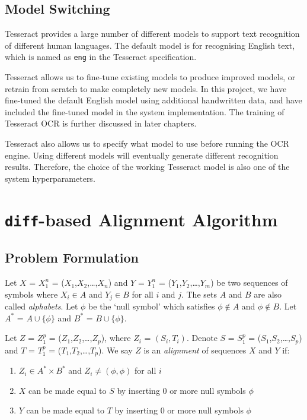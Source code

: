 \subsection{Model Switching}

Tesseract provides a large number of different models to support text recognition of different human languages. The default model is for recognising English text, which is named as \texttt{eng} in the Tesseract specification. 

Tesseract allows us to fine-tune existing models to produce improved models, or retrain from scratch to make completely new models. In this project, we have fine-tuned the default English model using additional handwritten data, and have included the fine-tuned model in the system implementation. The training of Tesseract OCR is further discussed in later chapters. 

Tesseract also allows us to specify what model to use before running the OCR engine. Using different models will eventually generate different recognition results. Therefore, the choice of the working Tesseract model is also one of the system hyperparameters.


\section{\texttt{diff}-based Alignment Algorithm}

\subsection{Problem Formulation}

Let $X$ = $X_1^n$ = ($X_1$,$X_2$,\ldots,$X_n$) and $Y$ = $Y_1^n$ = ($Y_1$,$Y_2$,\ldots,$Y_m$) be two sequences of symbols where $X_i \in A$ and $Y_j \in B$ for all $i$ and $j$. The sets $A$ and $B$ are also called \textit{alphabets}. Let $\phi$ be the `null symbol' which satisfies $\phi \notin A$ and $\phi \notin B$. Let $A^*$ = $A\cup\{\phi\}$ and $B^*$ = $B\cup\{\phi\}$.

Let $Z$ = $Z_1^p$ = ($Z_1$,$Z_2$,\ldots,$Z_p$), where $Z_i$ = $(S_i, T_i)$. Denote $S$ = $S_1^p$ = ($S_1$,$S_2$,\ldots,$S_p$) and $T$ = $T_1^p$ = ($T_1$,$T_2$,\ldots,$T_p$). We say $Z$ is an \textit{alignment} of sequences $X$ and $Y$ if:
\begin{enumerate}
  \item $Z_i \in A^* \times B^*$ and $Z_i \neq (\phi,\phi)$ for all $i$
  \item $X$ can be made equal to $S$ by inserting 0 or more null symbols $\phi$
  \item $Y$ can be made equal to $T$ by inserting 0 or more null symbols $\phi$
\end{enumerate}

